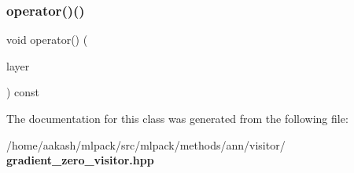 \subsubsection{operator()()\hspace{0.1cm}{\footnotesize\ttfamily [2/2]}}
{\footnotesize\ttfamily void operator() (\begin{DoxyParamCaption}\item[{\textbf{ More\+Types}}]{layer }\end{DoxyParamCaption}) const}



The documentation for this class was generated from the following file\+:\begin{DoxyCompactItemize}
\item 
/home/aakash/mlpack/src/mlpack/methods/ann/visitor/\textbf{ gradient\+\_\+zero\+\_\+visitor.\+hpp}\end{DoxyCompactItemize}
